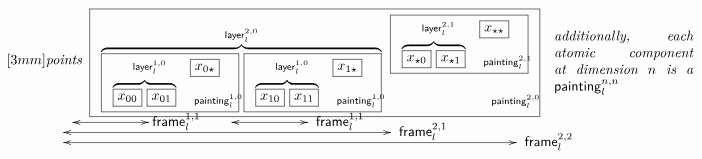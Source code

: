 \documentclass[12pt,landscape]{article}
\newcommand{\mybox}[1]{\mathsf{frame}_{#1}}
\newcommand{\mylayer}[1]{\mathsf{layer}_{#1}}
\newcommand{\mycube}[1]{\mathsf{painting}_{#1}}
\begin{document}
\begin{Large}
\begin{sf}
$$\begin{array}{l}
\begin{array}{lll}
[3mm]\mbox{\textit{points}}\\
[1mm]\end{array}
\framebox{$\begin{array}{lll}
\overbrace{\raisebox{0.05cm}{\framebox{$
\begin{array}{ll}
\raisebox{0cm}{\hspace{.5cm}{\scriptsize$\mylayer{l}^{1,0}$}}  & \framebox{$x_{0\star}$}\\
[1mm]\overbrace{\framebox{$x_{00}$}~\framebox{$x_{01}$}}&
\raisebox{-0.1cm}{{\scriptsize \hspace{0.1cm}$\mycube{l}^{1,0}\!\!\!\!\!\!\!\!$}}
\\
\end{array}
$}}~
{\raisebox{0.05cm}{\framebox{$
\begin{array}{ll}
\raisebox{0cm}{\hspace{.5cm}{\scriptsize$\mylayer{l}^{1,0}$}}  & \framebox{$x_{1\star}$}\\
[1mm]\overbrace{\framebox{$x_{10}$}~\framebox{$x_{11}$}}&
\raisebox{-0.1cm}{{\scriptsize \hspace{0.1cm}$\mycube{l}^{1,0}\!\!\!\!\!\!\!\!$}}
\end{array}
$}}}}^{\mylayer{l}^{2,0}}~
\stackrel{\raisebox{9.5mm}{$\framebox{$
\begin{array}{ll}
\raisebox{0cm}{\hspace{.5cm}{\scriptsize$\mylayer{l}^{2,1}$}} & \framebox{$x_{\star\star}$}\\
[1mm]\overbrace{\framebox{$x_{\star 0}$}~\framebox{$x_{\star 1}$}}&
\raisebox{-0.1cm}{{\scriptsize \hspace{0.1cm}$\mycube{l}^{2,1}\!\!\!\!\!\!\!\!$}}
\end{array}
$}
$}}{\raisebox{-0.4cm}{{\scriptsize \hspace{2.5cm}$\mycube{l}^{2,0}\!\!\!\!\!\!\!$}}}
\end{array}$}
~~~\parbox{3.5cm}{{\it additionally, each atomic component at dimension $n$ is a $\mycube{l}^{n,n}$}}\\
[-1mm]\qquad\qquad~~\xymatrix{ \ar@{<->}[rr] & & }\!\!\mbox{\normalsize $\mybox{l}^{1,1}$}
      \quad~~\xymatrix{ \ar@{<->}[rr] & & }\mbox{\normalsize $\mybox{l}^{1,1}$}\\
[-2mm]\qquad\qquad\xymatrix{ \ar@{<->}[rrrrrrrr] & & & & & & & & }\mbox{\normalsize$\mybox{l}^{2,1}$}\\
[-2mm]\qquad\qquad\xymatrix{ \ar@{<->}[rrrrrrrrrrr] & & & & & & & & & & & }\mbox{\normalsize$\mybox{l}^{2,2}$}\\
\end{array}
$$


\end{sf}
\end{Large}
\end{document}
